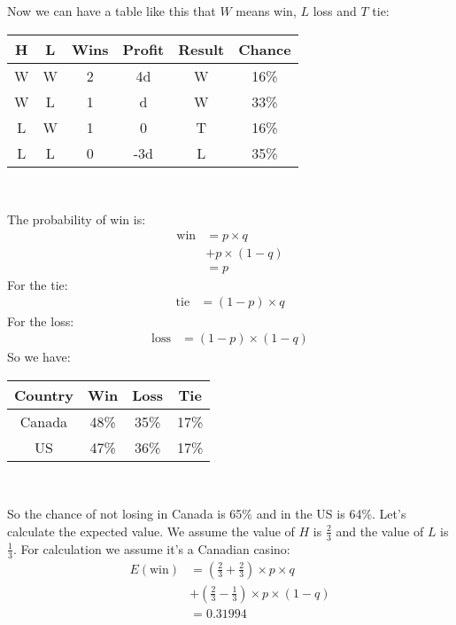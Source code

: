 \documentclass{book}
\begin{document}
	Now we can have a table like this that $W$ means win, $L$ loss and $T$ tie: \\
	\par
	\begin{tabular}[h!]{c c c c c c}
		\toprule
		H & L & Wins & Profit & Result & Chance \\
		\midrule
		W & W & 2 & 4d & W & 16\% \\
		W & L & 1 & d & W & 33\% \\
		L & W & 1 & 0 & T & 16\% \\
		L & L & 0 & -3d & L & 35\% \\
		\bottomrule
	\end{tabular} \\	
	\par The probability of win is:
	\begin{equation*}
		\begin{split}
			\text{win} &= p \times q \\
			&+ p \times (1 - q) \\
			&= p
		\end{split}
	\end{equation*}
	For the tie:
	\begin{equation*}
		\begin{split}
			\text{tie} &= (1 - p) \times q
		\end{split}
	\end{equation*}
	For the loss:
	\begin{equation*}
		\begin{split}
			\text{loss} &= (1 - p) \times (1 - q)
		\end{split}
	\end{equation*}
	So we have: \\
	\par 
	\begin{tabular}[h!]{c c c c}
		\toprule
		Country & Win & Loss & Tie \\
		\midrule
		Canada & 48\% & 35\% & 17\% \\
		US & 47\% & 36\% & 17\% \\
		\bottomrule
	\end{tabular} \\
	\par
	So the chance of not losing in Canada is 65\% and in the US is 64\%. Let's calculate the expected value. We assume the value of $H$ is $\frac{2}{3}$ and the value of $L$ is $\frac{1}{3}$. For calculation we assume it's a Canadian casino:
	\begin{equation*}
		\begin{split}
			E(\text{win}) &= (\frac{2}{3} + \frac{2}{3}) \times p \times q \\
			&+ (\frac{2}{3} - \frac{1}{3}) \times p \times (1 - q) \\
			&= 0.31994
		\end{split}
	\end{equation*}
\end{document}
